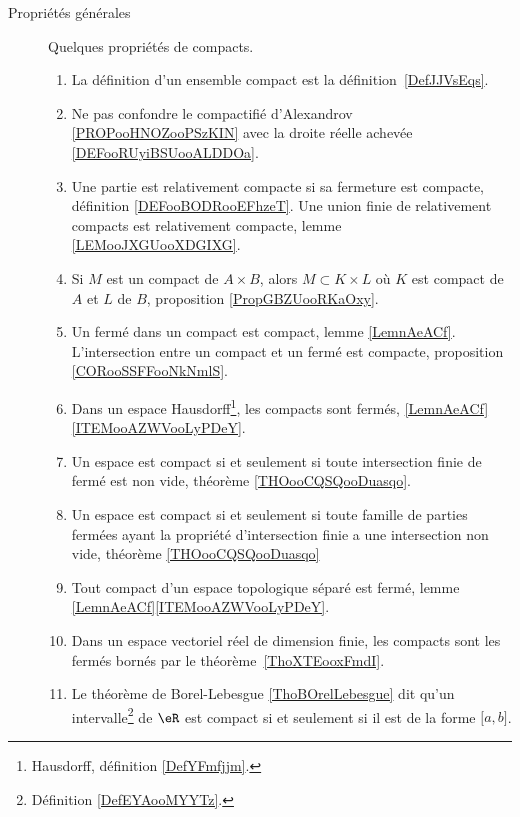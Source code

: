         \label{THEMEooQQBHooLcqoKB}
\begin{description}

	\item[Propriétés générales]

	      Quelques propriétés de compacts.

	      \begin{enumerate}
		      \item
		            La définition d'un ensemble compact est la définition~\ref{DefJJVsEqs}.
		      \item
		            Ne pas confondre le compactifié d'Alexandrov \ref{PROPooHNOZooPSzKIN} avec la droite réelle achevée \ref{DEFooRUyiBSUooALDDOa}.
		      \item
		            Une partie est relativement compacte si sa fermeture est compacte, définition \ref{DEFooBODRooEFhzeT}. Une union finie de relativement compacts est relativement compacte, lemme \ref{LEMooJXGUooXDGIXG}.
		      \item
		            Si \( M\) est un compact de \( A\times B\), alors \( M\subset K\times L\) où \( K\) est compact de \( A\) et \( L\) de \( B\), proposition \ref{PropGBZUooRKaOxy}.
		      \item
		            Un fermé dans un compact est compact, lemme \ref{LemnAeACf}. L'intersection entre un compact et un fermé est compacte, proposition \ref{CORooSSFFooNkNmlS}.
		      \item
		            Dans un espace Hausdorff\footnote{Hausdorff, définition \ref{DefYFmfjjm}.}, les compacts sont fermés, \ref{LemnAeACf}\ref{ITEMooAZWVooLyPDeY}.
		      \item
		            Un espace est compact si et seulement si toute intersection finie de fermé est non vide, théorème \ref{THOooCQSQooDuasqo}.
		      \item
		            Un espace est compact si et seulement si toute famille de parties fermées ayant la propriété d'intersection finie a une intersection non vide, théorème \ref{THOooCQSQooDuasqo}
		      \item
		            Tout compact d'un espace topologique séparé est fermé, lemme \ref{LemnAeACf}\ref{ITEMooAZWVooLyPDeY}.
		      \item
		            Dans un espace vectoriel réel de dimension finie, les compacts sont les fermés bornés par le théorème~\ref{ThoXTEooxFmdI}.
		      \item
		            Le théorème de Borel-Lebesgue \ref{ThoBOrelLebesgue} dit qu'un intervalle\footnote{Définition \ref{DefEYAooMYYTz}.} de \( \eR\) est compact si et seulement si il est de la forme \( \mathopen[ a , b \mathclose]\).

\end{enumerate}
\end{description}
